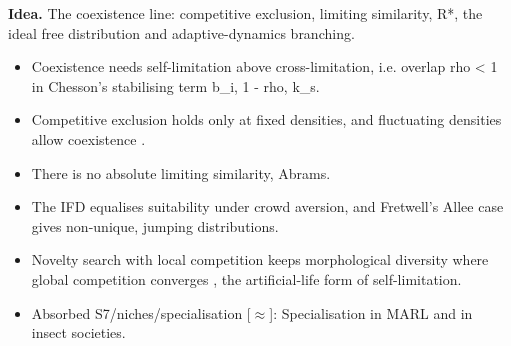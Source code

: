 \documentclass[10pt]{article}
\begin{document}
\textbf{Idea.} The coexistence line: competitive exclusion, limiting similarity, R*, the ideal free distribution and adaptive-dynamics branching.
\begin{itemize}[nosep,leftmargin=1.2em]
\item Coexistence needs self-limitation above cross-limitation, i.e. overlap rho \textless{} 1 in Chesson's stabilising term b\_i, 1 - rho, k\_s.
\item Competitive exclusion holds only at fixed densities, and fluctuating densities allow coexistence \citep{Armstrong-competitive80}.
\item There is no absolute limiting similarity, Abrams.
\item The IFD equalises suitability under crowd aversion, and Fretwell's Allee case gives non-unique, jumping distributions.
\item Novelty search with local competition keeps morphological diversity where global competition converges \citep{Lehman-evolving11}, the artificial-life form of self-limitation.
\item Absorbed S7/niches/specialisation [\ensuremath{\approx}]: Specialisation in MARL and in insect societies.
\end{itemize}
\end{document}
